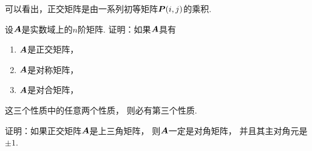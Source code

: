 可以看出，正交矩阵是由一系列初等矩阵\(\boldsymbol{P}(i,j)\)的乘积.

\begin{example}
设\(\boldsymbol{A}\)是实数域上的\(n\)阶矩阵.
证明：如果\(\boldsymbol{A}\)具有\begin{enumerate}
	\item \(\boldsymbol{A}\)是正交矩阵，
	\item \(\boldsymbol{A}\)是对称矩阵，
	\item \(\boldsymbol{A}\)是对合矩阵，
\end{enumerate}
这三个性质中的任意两个性质，
则必有第三个性质.
\end{example}

\begin{example}
证明：如果正交矩阵\(\boldsymbol{A}\)是上三角矩阵，
则\(\boldsymbol{A}\)一定是对角矩阵，
并且其主对角元是\(\pm1\).
\end{example}
